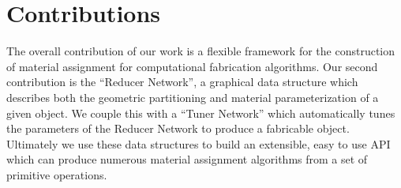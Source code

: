 \documentclass[annual]{acmsiggraph}
\begin{document}
\section{Contributions}
The overall contribution of our work is a flexible framework for the construction of material assignment for computational fabrication algorithms. Our second contribution is the ``Reducer Network'',  a graphical data structure which describes both the geometric partitioning and material parameterization of  a given object. We couple this with a ``Tuner Network'' which automatically tunes the parameters of the Reducer Network to produce a fabricable object. Ultimately  we use these data structures to build an extensible, easy to use API which can produce numerous material assignment algorithms from a set of primitive operations.
\end{document}
